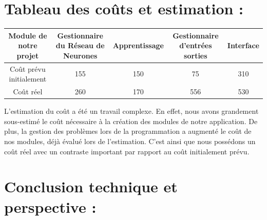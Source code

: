 \documentclass{article}
\begin{document}
\section{Tableau des coûts et estimation :}
{\setlength{\tabcolsep}{0.07cm}
		\begin{center}
		\small
		\begin{tabular}{|c|c|c|c|c|}
		\hline
		Module de notre projet & Gestionnaire du Réseau de Neurones & Apprentissage & Gestionnaire d'entrées sorties & Interface\\
		\hline
		Coût prévu initialement & 155 & 150 & 75 & 310\\
		\hline
		Coût réel & 260 & 170 & 556 & 530\\
		\hline
		\end{tabular}
		\end{center}
 }
L'estimation du coût a été un travail complexe. En effet, nous avons grandement sous-estimé le coût nécessaire à la création des modules de notre application. 
De plus, la gestion des problèmes lors de la programmation a augmenté le coût de nos modules, déjà évalué lors de l'estimation. C'est ainsi que nous possédons un coût réel avec  un contraste important par rapport au coût initialement prévu.

\section{Conclusion technique et perspective :}
\end{document}
